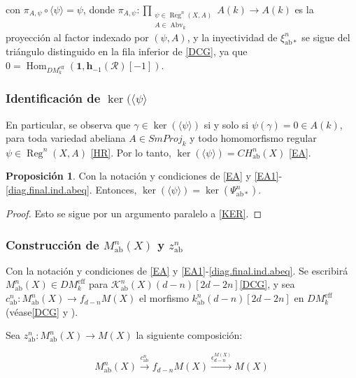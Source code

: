 \documentclass[10pt]{amsart}
\theoremstyle{definition}
\newtheorem{proposition}[definition]{Proposici\'on}
\theoremstyle{remark}
\theoremstyle{definition}
\begin{document}
con $\pi_{A,\psi} \circ \langle\psi\rangle = \psi$, donde $\pi_{A,\psi}: \prod_{\substack{\psi \in \operatorname{Reg}^{n}(X,A) \\ A \in \operatorname{Abv}_{k}}} A(k) \to A(k)$ es la proyección al factor indexado por $(\psi,A)$, y la inyectividad de $\xi^{n}_{\mathrm{ab}*}$ se sigue del triángulo distinguido en la fila inferior de \ref{DCG}, ya que $0 = \operatorname{Hom}_{DM_{k}^{\mathrm{eff}}}(\mathbf{1},\mathbf{h}_{-1}(\mathcal{R})[-1])$.

\subsubsection{Identificación de $\ker(\langle\psi\rangle$}\label{Prop} En particular, se observa que $\gamma \in \ker(\langle\psi\rangle)$ si y solo si $\psi(\gamma) = 0 \in A(k)$, para toda variedad abeliana $A \in SmProj_{k}$ y todo homomorfismo regular $\psi \in \operatorname{Reg}^{n}(X,A)$ \ref{HR}. Por lo tanto, $\ker(\langle\psi\rangle) = CH^{n}_{\mathrm{ab}}(X)$ \ref{EA}.

\begin{proposition}\label{Prop1}
Con la notación y condiciones de \ref{EA} y \ref{EA1}-\ref{diag.final.ind.abeq}. Entonces, $\ker(\langle\psi\rangle) = \ker(\Psi^{n}_{\mathrm{ab}*})$.
\end{proposition}

\begin{proof}
Esto se sigue por un argumento paralelo a \ref{KER}.
\end{proof}

\subsubsection{Construcción de  $M^{n}_{\mathrm{ab}}(X)$ y $z^{n}_{\mathrm{ab}}$}\label{4.1.11} Con la notación y condiciones de \ref{EA} y \ref{EA1}-\ref{diag.final.ind.abeq}. Se escribirá $M^{n}_{\mathrm{ab}}(X) \in DM_{k}^{\mathrm{eff}}$ para $\mathcal{K}^{n}_{\mathrm{ab}}(X)(d-n)[2d-2n]$\ref{DCG}, y sea $c^{n}_{\mathrm{ab}}: M^{n}_{\mathrm{ab}}(X) \to f_{d-n}M(X)$ el morfismo $k^{n}_{\mathrm{ab}}(d-n)[2d-2n]$ en $DM_{k}^{\mathrm{eff}}$ (véase\ref{DCG} y \cite[3.3.3(2)]{Pel17}).

Sea $z^{n}_{\mathrm{ab}}: M^{n}_{\mathrm{ab}}(X) \to M(X)$ la siguiente composición:

\[
M^{n}_{\mathrm{ab}}(X) \xrightarrow{c^{n}_{\mathrm{ab}}} f_{d-n}M(X) \xrightarrow{\epsilon^{M(X)}_{d-n}} M(X)
\]
\end{document}
